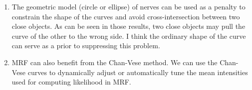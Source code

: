 \documentclass[a4paper]{article}
\begin{document}
\begin{enumerate}
\begin{itemize}
\begin{enumerate}
			\item The geometric model (circle or ellipse) of nerves can be used as a penalty to constrain the shape of the curves and avoid cross-intersection between two close objects. As can be seen in those results, two close objects may pull the curve of the other to the wrong side. I think the ordinary shape of the curve can serve as a prior to suppressing this problem.
			\item MRF can also benefit from the Chan-Vese method. We can use the Chan-Vese curves to dynamically adjust or automatically tune the mean intensities used for computing likelihood in MRF.
		\end{enumerate}
	\end{itemize}		
	\end{enumerate}		
	
	
	
\end{document}
